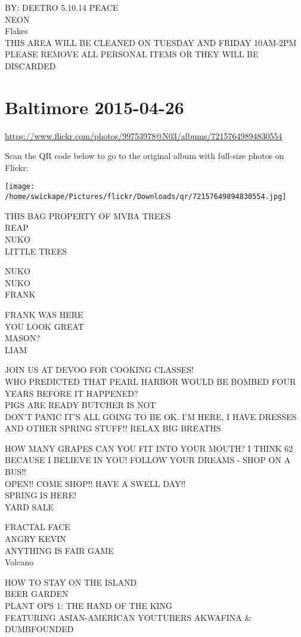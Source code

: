 \documentclass[10pt,letterpaper]{article}
\begin{document}
BY: DEETRO 5.10.14 PEACE\\
NEON\\
Flakes\\
THIS AREA WILL BE CLEANED ON TUESDAY AND FRIDAY 10AM{-}2PM PLEASE REMOVE ALL PERSONAL ITEMS OR THEY WILL BE DISCARDED


\section*{Baltimore 2015-04-26}

\url{https://www.flickr.com/photos/99753978@N03/albums/72157649894830554}

Scan the QR code below to go to the original album with full-size photos on Flickr:

\texttt{[image: /home/swickape/Pictures/flickr/Downloads/qr/72157649894830554.jpg]}


THIS BAG PROPERTY OF MVBA TREES\\
REAP\\
NUKO\\
LITTLE TREES

NUKO\\
NUKO\\
FRANK

FRANK WAS HERE\\
YOU LOOK GREAT\\
MASON?\\
LIAM

JOIN US AT DEVOO FOR COOKING CLASSES!\\
WHO PREDICTED THAT PEARL HARBOR WOULD BE BOMBED FOUR YEARS BEFORE IT HAPPENED?\\
PIGS ARE READY BUTCHER IS NOT\\
DON'T PANIC IT'S ALL GOING TO BE OK.  I'M HERE, I HAVE DRESSES AND OTHER SPRING STUFF!!  RELAX BIG BREATHS

HOW MANY GRAPES CAN YOU FIT INTO YOUR MOUTH?  I THINK 62 BECAUSE I BELIEVE IN YOU!  FOLLOW YOUR DREAMS {-} SHOP ON A BUS!!\\
OPEN!! COME SHOP!! HAVE A SWELL DAY!!\\
SPRING IS HERE!\\
YARD SALE

FRACTAL FACE\\
ANGRY KEVIN\\
ANYTHING IS FAIR GAME\\
Volcano

HOW TO STAY ON THE ISLAND\\
BEER GARDEN\\
PLANT OPS 1: THE HAND OF THE KING\\
FEATURING ASIAN{-}AMERICAN YOUTUBERS AKWAFINA \& DUMBFOUNDED
\end{document}
